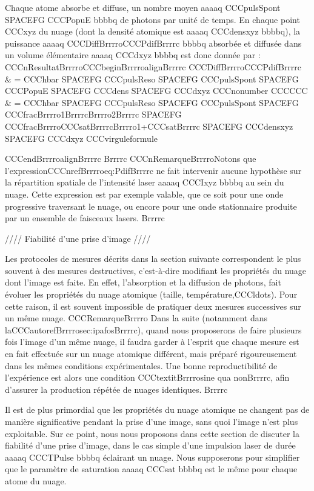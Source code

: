 Chaque atome absorbe et diffuse,
 un nombre moyen aaaaq CCCpulsSpont SPACEFG CCCPopuE bbbbq de photons par unité de temps. En chaque point CCCxyz du nuage (dont la densité atomique est aaaaq CCCdensxyz bbbbq), la puissance aaaaq CCCDiffBrrrroCCCPdifBrrrrc bbbbq absorbée et diffusée dans un volume élémentaire aaaaq CCCdxyz bbbbq est donc donnée par   :
CCCnResultatBrrrroCCCbeginBrrrroalignBrrrrc
	CCCDiffBrrrroCCCPdifBrrrrc & = CCChbar SPACEFG CCCpulsReso SPACEFG CCCpulsSpont SPACEFG CCCPopuE  SPACEFG  CCCdens SPACEFG CCCdxyz CCCnonumber CCCCCC
	& = CCChbar SPACEFG CCCpulsReso SPACEFG  CCCpulsSpont  SPACEFG  CCCfracBrrrro1BrrrrcBrrrro2Brrrrc 
	 SPACEFG  CCCfracBrrrroCCCsatBrrrrcBrrrro1+CCCsatBrrrrc
	 SPACEFG  CCCdensxyz SPACEFG CCCdxyz 
	CCCvirguleformule
	
CCCendBrrrroalignBrrrrc
Brrrrc
CCCnRemarqueBrrrroNotons que l'expressionCCCnrefBrrrroeq:PdifBrrrrc ne fait intervenir aucune hypothèse sur la répartition spatiale de l'intensité laser aaaaq CCCIxyz bbbbq au sein du nuage. Cette expression est par exemple valable, que ce soit pour une onde progressive traversant le nuage, ou encore pour une onde stationnaire produite par un ensemble de faisceaux lasers.
Brrrrc




//// Fiabilité d'une prise d'image ////


Les protocoles de mesures décrits dans la section suivante correspondent le plus souvent à des mesures destructives, c'est-à-dire modifiant les propriétés du nuage dont l'image est faite. En effet, l'absorption et la diffusion de photons, fait évoluer les propriétés du nuage atomique (taille, température,CCCldots).
Pour cette raison, il est souvent impossible de pratiquer deux mesures successives sur un même nuage. 
CCCRemarqueBrrrro
Dans la suite (notamment dans laCCCautorefBrrrrosec:ipafosBrrrrc), quand nous proposerons de faire plusieurs fois l'image d'un même nuage, il faudra garder à l'esprit que chaque mesure est en fait effectuée sur un nuage atomique différent, mais préparé rigoureusement dans les mêmes conditions expérimentales. Une bonne reproductibilité de l'expérience est alors une condition CCCtextitBrrrrosine qua nonBrrrrc, afin d'assurer la production répétée de nuages identiques.
Brrrrc


Il est de plus primordial que les propriétés du nuage atomique ne changent pas de manière significative pendant la prise d'une image, sans quoi l'image n'est plus exploitable. Sur ce point, nous nous proposons dans cette section de discuter la fiabilité d'une prise d'image, dans le cas simple d'une impulsion laser de durée aaaaq CCCTPulse bbbbq éclairant un nuage. Nous supposerons pour simplifier que le paramètre de saturation aaaaq CCCsat bbbbq est le même pour chaque atome du nuage.

